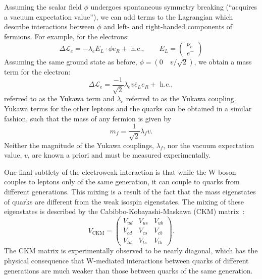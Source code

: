 Assuming the scalar field $\phi$ undergoes spontaneous symmetry breaking (``acquires a vacuum expectation value''), we can add terms to the Lagrangian which describe interactions between $\phi$ and left- and right-handed components of fermions.
For example, for the electrons:
\begin{equation}
\Delta \mathcal L_e = - \lambda_e \bar{E}_L \cdot \phi e_R + \text{ h.c.}, \qquad E_L = \begin{pmatrix} \nu_e \\ e^- \end{pmatrix} 
\end{equation}
Assuming the same ground state as before, $\phi = (0 \quad v/\sqrt{2})$, we obtain a mass term for the electron:
\begin{equation}
    \Delta \mathcal L_e = \frac{-1}{\sqrt{2}} \lambda_e v \bar{e}_L e_R + \text{ h.c.},
\end{equation}
referred to as the Yukawa term and $\lambda_e$ referred to as the Yukawa coupling.
Yukawa terms for the other leptons and the quarks can be obtained in a similar fashion, such that the mass of any fermion is given by
\begin{equation}
    m_f = \frac{1}{\sqrt{2}} \lambda_f v.
\end{equation}
Neither the magnitude of the Yukawa couplings, $\lambda_f$, nor the vacuum expectation value, $v$, are known a priori and must be measured experimentally.

One final subtlety of the electroweak interaction is that while the W boson couples to leptons only of the same generation, it can couple to quarks from different generations.
This mixing is a result of the fact that the mass eigenstates of quarks are different from the weak isospin eigenstates.
The mixing of these eigenstates is described by the Cabibbo-Kobayashi-Maskawa (CKM) matrix~\cite{Cabibbo:1963yz,Kobayashi:1973fv}:
\begin{equation}
V_{\text{CKM}} = \begin{pmatrix} V_{ud} & V_{us} & V_{ub} \\ V_{cd} & V_{cs} & V_{cb} \\ V_{td} & V_{ts} & V_{tb} \end{pmatrix}.
\end{equation}
The CKM matrix is experimentally observed to be nearly diagonal, which has the physical consequence that W-mediated interactions between quarks of different generations are much weaker than those between quarks of the same generation.

